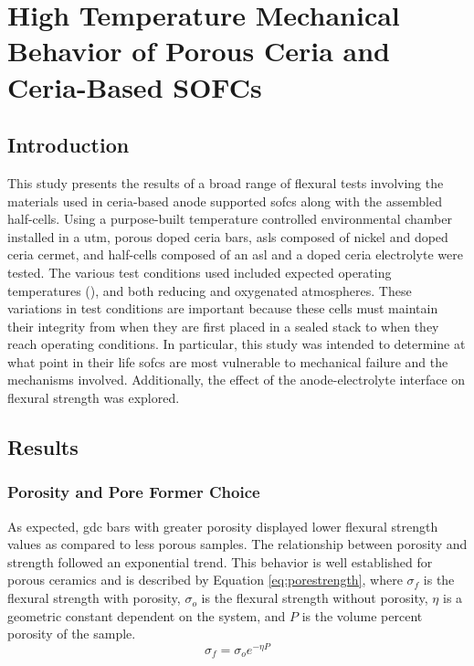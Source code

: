 


\chapter{High Temperature Mechanical Behavior of Porous Ceria and Ceria-Based SOFCs}

\section{Introduction}
This study presents the results of a broad range of flexural tests involving the materials used in ceria-based anode supported \glspl{sofc} along with the assembled half-cells.
Using a purpose-built temperature controlled environmental chamber installed in a \gls{utm}, porous doped ceria bars, \glspl{asl} composed of nickel and doped ceria cermet, and half-cells composed of an \gls{asl} and a doped ceria electrolyte were tested.
The various test conditions used included expected operating temperatures (), and both reducing and oxygenated atmospheres.
These variations in test conditions are important because these cells must maintain their integrity from when they are first placed in a sealed stack to when they reach operating conditions.
In particular, this study was intended to determine at what point in their life \glspl{sofc} are most vulnerable to mechanical failure and the mechanisms involved.
Additionally, the effect of the anode-electrolyte interface on flexural strength was explored.

\section{Results}

\subsection{Porosity and Pore Former Choice}

As expected, \gls{gdc} bars with greater porosity displayed lower flexural strength values as compared to less porous samples.
The relationship between porosity and strength followed an exponential trend.
This behavior is well established for porous ceramics and is described by
Equation \ref{eq:porestrength}, where \(\sigma_{f}\) is the flexural strength with porosity,
\(\sigma_{o}\) is the flexural strength without porosity, \(\eta\) is a geometric constant dependent on the system, and \(P\) is the volume percent porosity of the sample.\cite{Rice1998}
\begin{equation}
    \sigma_f = \sigma_o e^{-\eta{}P}
    \label{eq:porestrength}
\end{equation}

